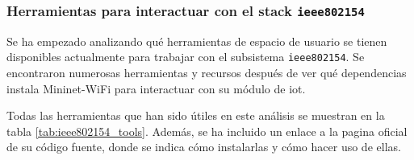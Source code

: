 \subsubsection{Herramientas para interactuar con el stack \texttt{ieee802154}}

Se ha empezado analizando qué herramientas de espacio de usuario se tienen disponibles actualmente para trabajar con el subsistema \texttt{ieee802154}. Se encontraron numerosas herramientas y recursos después de ver qué dependencias instala Mininet-WiFi para interactuar con su módulo de \gls{iot}. \\
\par
Todas las herramientas que han sido útiles en este análisis se muestran en la tabla \ref{tab:ieee802154_tools}. Además, se ha incluido un enlace a la pagina oficial de su código fuente, donde se indica cómo instalarlas y cómo hacer uso de ellas.

\vspace{0.5cm}

